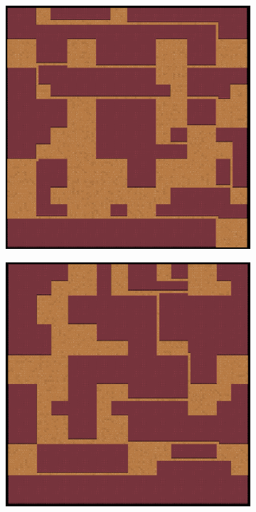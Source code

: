 \begin{figure}[H]
\begin{subfigure}{.5\textwidth}
  \label{fig:sfig2}
\end{subfigure}
\begin{subfigure}{.5\textwidth}
  \centering
  \includegraphics[width=.8\linewidth]{../images/pcg_quadtree/pcg3.png}
  \label{fig:sfig1}
\end{subfigure}%
\begin{subfigure}{.5\textwidth}
  \centering
  \includegraphics[width=.8\linewidth]{../images/pcg_quadtree/pcg4.png}
  \label{fig:sfig2}
\end{subfigure}
\begin{subfigure}{.5\textwidth}
  \centering

\end{subfigure}
\end{figure}
